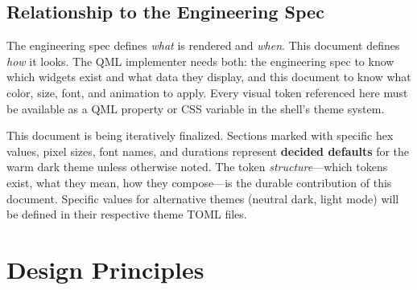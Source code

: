 \documentclass[11pt,a4paper]{article}
\begin{document}
\subsection{Relationship to the Engineering Spec}

The engineering spec defines \emph{what} is rendered and \emph{when}. This document defines \emph{how} it looks. The QML implementer needs both: the engineering spec to know which widgets exist and what data they display, and this document to know what color, size, font, and animation to apply. Every visual token referenced here must be available as a QML property or CSS variable in the shell's theme system.

\begin{notebox}
This document is being iteratively finalized. Sections marked with specific hex values, pixel sizes, font names, and durations represent \textbf{decided defaults} for the warm dark theme unless otherwise noted. The token \emph{structure}---which tokens exist, what they mean, how they compose---is the durable contribution of this document. Specific values for alternative themes (neutral dark, light mode) will be defined in their respective theme TOML files.
\end{notebox}


\section{Design Principles}
\label{sec:principles}
\end{document}

